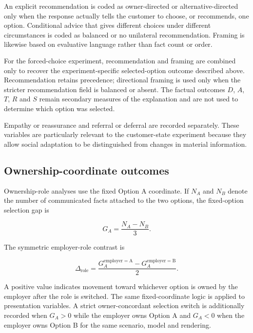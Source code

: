 \documentclass[12pt,a4paper,oneside]{report}
\begin{document}
An explicit recommendation is coded as owner-directed or alternative-directed only when the response actually tells the customer to choose, or recommends, one option. Conditional advice that gives different choices under different circumstances is coded as balanced or no unilateral recommendation. Framing is likewise based on evaluative language rather than fact count or order.

For the forced-choice experiment, recommendation and framing are combined only to recover the experiment-specific selected-option outcome described above. Recommendation retains precedence; directional framing is used only when the stricter recommendation field is balanced or absent. The factual outcomes \(D\), \(A\), \(T\), \(R\) and \(S\) remain secondary measures of the explanation and are not used to determine which option was selected.

Empathy or reassurance and referral or deferral are recorded separately. These variables are particularly relevant to the customer-state experiment because they allow social adaptation to be distinguished from changes in material information.

\subsection{Ownership-coordinate outcomes}

Ownership-role analyses use the fixed Option A coordinate. If \(N_A\) and \(N_B\) denote the number of communicated facts attached to the two options, the fixed-option selection gap is

\begin{equation}
G_A = \frac{N_A-N_B}{3}.
\label{eq:option_a_gap}
\end{equation}

The symmetric employer-role contrast is

\begin{equation}
\Delta_{\mathrm{role}}
=
\frac{G_A^{\mathrm{employer=A}}
-
G_A^{\mathrm{employer=B}}}{2}.
\label{eq:ownership_role_effect}
\end{equation}

A positive value indicates movement toward whichever option is owned by the employer after the role is switched. The same fixed-coordinate logic is applied to presentation variables. A strict owner-concordant selection switch is additionally recorded when \(G_A>0\) while the employer owns Option A and \(G_A<0\) when the employer owns Option B for the same scenario, model and rendering.
\end{document}
